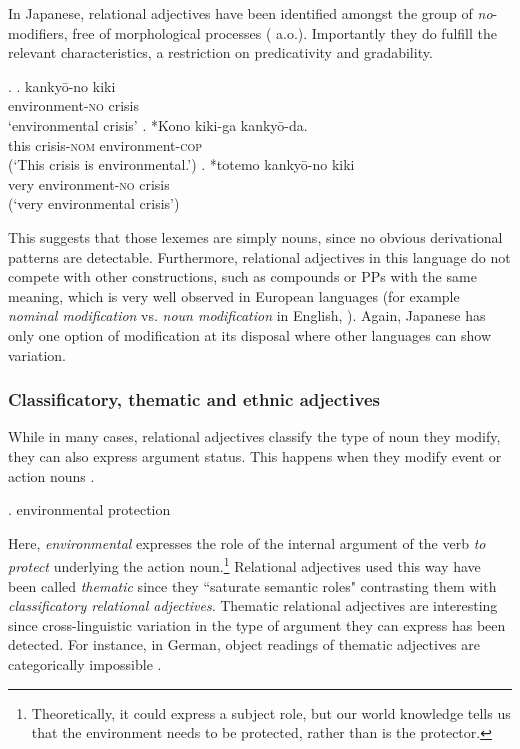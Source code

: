 In Japanese, relational adjectives have been identified amongst the group of \textit{no}-modifiers, free of morphological processes (\citealt{bisetto:2010:RA, nagano:2016:are} a.o.). Importantly they do fulfill the relevant characteristics, a restriction on predicativity and gradability.

\ex. \ag. kankyō-no kiki \\
environment-\textsc{no} crisis\\
`environmental crisis’
\bg. *Kono kiki-ga kankyō-da.\\
this crisis-\textsc{nom} environment-\textsc{cop}\\
(`This crisis is environmental.’)
\cg. *totemo kankyō-no kiki \\
very environment-\textsc{no} crisis\\
(`very environmental crisis’)

This suggests that those lexemes are simply nouns, since no obvious derivational patterns are detectable. Furthermore, relational adjectives in this language do not compete with other constructions, such as compounds or PPs with the same meaning, which is very well observed in European languages (for example \textit{nominal modification} vs. \textit{noun modification} in  English, \citealt{hacken:2013:compounds, rainer:2013:can, nikolaeva:2020:mixed}). Again, Japanese has only one option of modification at its disposal where other languages can show variation.

\subsubsection{Classificatory, thematic and ethnic adjectives}

While in many cases, relational adjectives classify the type of noun they modify, they can also express argument status. This happens when they modify event or action nouns \citep{grimshaw:1991:argument}.

\ex. environmental protection

Here, \textit{environmental} expresses the role of the internal argument of the verb \textit{to protect} underlying the action noun.\footnote{Theoretically, it could express a subject role, but our world knowledge tells us that the environment needs to be protected, rather than is the protector.} Relational adjectives used this way have been called \textit{thematic} since they ``saturate semantic roles" \citep[360]{bosque:1996:postnominal} contrasting them with \textit{classificatory relational adjectives}. Thematic relational adjectives are interesting since cross-linguistic variation in the type of argument they can express has been detected. For instance, in  German, object readings of thematic adjectives are categorically impossible \citep{gunkel:2008:constraints}.

